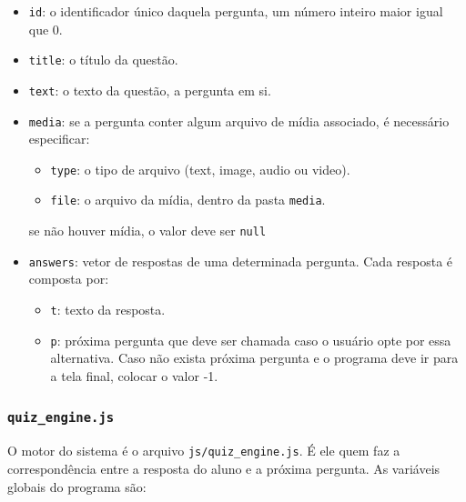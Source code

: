 \documentclass{article}
\begin{document}
\begin{itemize}
\item \texttt{id}: o identificador único daquela pergunta, um número inteiro maior igual que 0.

\item \texttt{title}: o título da questão.

\item \texttt{text}: o texto da questão, a pergunta em si.

\item \texttt{media}: se a pergunta conter algum arquivo de mídia associado, é necessário especificar:

	\begin{itemize}
	\item \texttt{type}: o tipo de arquivo (text, image, audio ou video).
		
	\item \texttt{file}: o arquivo da mídia, dentro da pasta \texttt{media}.
	\end{itemize}

se não houver mídia, o valor deve ser \texttt{null}

\item \texttt{answers}: vetor de respostas de uma determinada pergunta. Cada resposta é composta por:

	\begin{itemize}
	\item \texttt{t}: texto da resposta.
	
	\item \texttt{p}: próxima pergunta que deve ser chamada caso o usuário opte por essa alternativa. Caso não exista próxima pergunta e o programa deve ir para a tela final, colocar o valor -1.
		
	\end{itemize}
	
\end{itemize}

\subsubsection{\texttt{quiz\_engine.js}}

O motor do sistema é o arquivo \texttt{js/quiz\_engine.js}. É ele quem faz a correspondência entre a resposta do aluno e a próxima pergunta. As variáveis globais do programa são:
\end{document}
